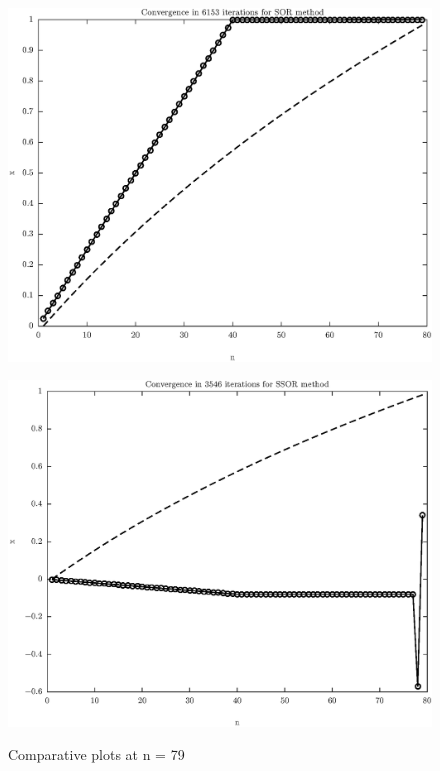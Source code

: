 \documentclass[11pt]{article}
\begin{document}
\begin{figure}
\begin{minipage}{.45\textwidth}
\label{fig:test2}
\end{minipage}\hfill
\\
\begin{minipage}{.45\textwidth}
\centering
\includegraphics[width=\linewidth]{math609_pa2_comp_example_1_n_79_k_SOR_part_b.eps}
\label{fig:test3}
\end{minipage}\hfill
\begin{minipage}{.45\textwidth}
\centering
\includegraphics[width=\linewidth]{math609_pa2_comp_example_1_n_79_k_SSOR_part_b.eps}
\label{fig:test3}
\end{minipage}\hfill
\caption{Comparative plots at n = 79}
\end{figure}
\end{document}
